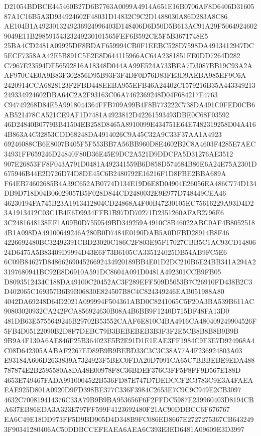 \documentclass[UTF8,fontset=fandol,zihao=-4,a4paper]{ctexart}
\begin{document}
{{D21054BDBCE445460B27D6B7763A0099A4914A651E16B0706AF8D6406D3160587A1C16B5A3D934924602F48031D14832C9C2D1488030A86D283A8C86
AE104B1A4923013249236924996403D148406D6D50D5B613AC91A29F50649246029049E11B29859154323249230101565FEF6B592CE5F5B3671748E5
25BA4CD2481A09925DF8BDAF659994CB0F1EEBC528D7598DA4913412947DC5ECF7358AA42E5B891C5E2E8D644115966AC64A2381851FE0DD7264D282
C7967E23594DE56592816A18348D044AA99E524A733BEA7D3087BB19C93A2AAF970C4E0A9B83F302856D95B93F3F4DF0D76D83FE3D9AEBA985EF9C6A
2420914CCA6828123F2FBD448EEBA955EFB46A24402C1579216B35A443349213249334924602DBA64C2A2F93163C06A7462369248D04F684217E4763
C94749268D84E5A9918044364FFB709A99B4F8B773222C738DA491C0FED0CB6AB521478CA521CE9AF1D7481A4923812D42261593493DBE0C68F03592
46D24840B0779BB41504EB258D8465A8910099E434751E64E7482319258D04A4164B863A4C32853CDD68248DA4914026C9A45C32A9C33F37AA1A4923
69246088CB6E8007B405F5F553BB7A56BB960D8E4602B2C8A4603F4285E7AEC34931FF659246D24840F80D36E45E9DC2A521D9DDCFA5D31276AE3512
907E26853FF8F043A791D0481A492341559B6D858D574684B86E6A24E75A2301D675946B44E2D726D74D8DE45C6B2480792E16216F1D8FBE2BBA689A
F64EB74602685B4A39C652AB0774D134E19D6E8D04904E26056EA486C774D134DB9D718D04B06029057B5F028D844CD2480032E9E977D748449CEA46
46230194FA745B23A1913412804CD24868A4F00B47230105EC75616229A93D4D23A1913412C03C1B4E6D9934FFB1B97DD70271D2351260AFAB2796E6
3C2481648138EF1A09B0D7559549BD349259A4910C8B46022ABC0AF4B80525184B1A098DA49100649246A280B0D7484E0190DAB5A0DFBD28914B8F46
4226692480BC32492391CBD23020C186C2F803E95F17027CBB5C1AC93CD1480624D6475A5B83409D9994D43E6F73B6105CA335124025DB54AB9FC5E6
6C09B84627D8486626904526692434920189BB4E01D2DC210B6E24BB341A294A23197680941BC92E8D6910A591DC8604A091D0481A492301CCB9FB05
D8093512434C188DA49100C20452AC3F289EFF509D5053B7C26910FD438B2C3D402065C169357B6B9B06830E824507B8C4C824349246EAB051988A80
4042DA69248D64D2021A099994F504361ABD0C8241065C5F20A3BA539B611AC90803020932CA242FCA856924630B08A4B6BB9F1240D715DF48FA13D0
481DB63E5755649246B29702B53552CAAF6E810C4BA4916CA480409249904526F5FB4D05122090B2D8F7DEBC79B3BEBEBEB3B3F3F2E5CB8B8B8B9B9B
9B9A4F130A6AE846F25B364023E5B2E91D1E1EAE3FF1984C9F3E7D924968A4C08D642305AABAF2267ED89B9B9BEBD33C3C3C38A77A4F236924803A03
E93184A606D2633839A7324923F5BEC0FDA20D7091CA65C7BBBEBE9EDA488787874E2B2595580A8DA48E00978F8C36BDEF376C3FF5F8FF9D567E188D
4653E749467FADA9910004522B536FD87E747D7DEDCCF2C3783C9E3A4FAEAEAE925D801A0920D9FD398BE377C336F3984C2653E7C9C9C949E2CB3097
4632C700819414376C33A79B9B9BA953656F6F2FFDC5987E239960403D8194CBA637EB86EDA3A323E797FF599F4123692480F21AC90DDBCC6F676767
EA6C49E18DD973FF5D9BD905D4D348B9FC086ED8667E2727275367CB6432493F90341280406AC50DDBCCEFEAEA6AEA6C393E3ED6481A09609E3D3997
}}
\end{document}
